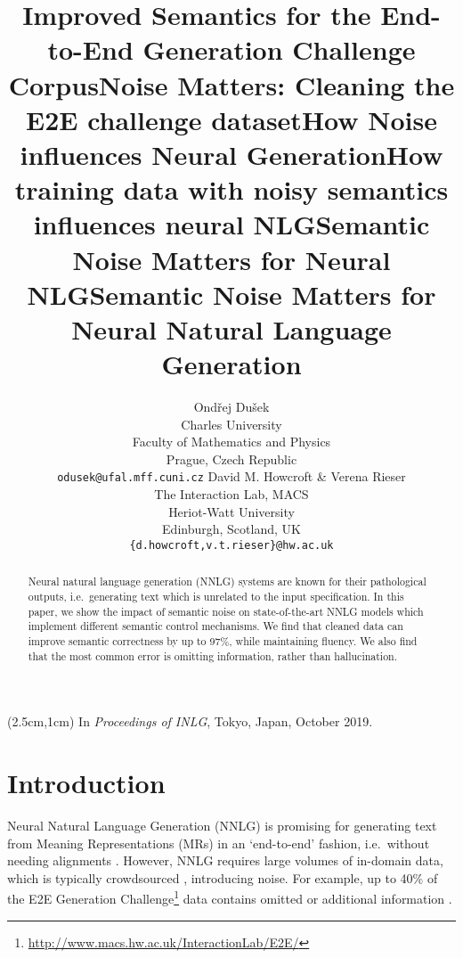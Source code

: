\documentclass[11pt,a4paper]{article}
\title{Improved Semantics for the End-to-End Generation Challenge Corpus}
\title{Noise Matters: Cleaning the E2E challenge dataset}
\title{How \OD{Training Data} Noise influences Neural Generation}
\title{How training data with noisy semantics influences neural NLG}
\title{Semantic Noise Matters for Neural NLG}
\title{Semantic Noise Matters for Neural Natural Language Generation}
\author{Ondřej Dušek\\ Charles University\\ 
Faculty of Mathematics and Physics \\
Prague, Czech Republic\\
\hspace{-2em}\texttt{odusek@ufal.mff.cuni.cz}
\And 
David M. Howcroft {\rm \&} Verena Rieser\\
The Interaction Lab, MACS\\
Heriot-Watt University \\
Edinburgh, Scotland, UK\\
\texttt{\{d.howcroft,v.t.rieser\}@hw.ac.uk}}
\date{}
\begin{document}
\maketitle

\begin{textblock*}{\textwidth}(2.5cm,1cm)
In \emph{Proceedings of INLG}, Tokyo, Japan, October 2019.
\end{textblock*}

\begin{abstract}

\setcounter{footnote}{1}
\renewcommand{\thefootnote}{\fnsymbol{footnote}}
\setcounter{footnote}{0}

Neural natural language generation (NNLG) systems are known for their pathological outputs, i.e.\ generating text which is unrelated to the input specification. In this paper, we show the impact of semantic noise on state-of-the-art NNLG models which implement different semantic control mechanisms.
We find that cleaned data can improve semantic correctness by up to 97\%, while maintaining fluency. 
We also find that the most common error is omitting information, rather than hallucination.
 
\end{abstract}


\section{Introduction}
\label{sec:introduction}

Neural Natural Language Generation (NNLG) is promising for generating text from Meaning Representations (MRs) in an  `end-to-end' fashion, i.e.\ without needing alignments \cite{wen:emnlp2015, Wen:NAACL16, Dusek:ACL16, Mei:NAACL2016}. 
However, NNLG requires large volumes of in-domain data, which is typically crowdsourced \citep[e.g.][]{mairesse:acl2010,novikova:INLG2016,wen:emnlp2015,Wen:NAACL16,howcroft.etal2017:interspeech}, introducing noise. 
For example, up to 40\% of the E2E Generation Challenge\footnote{\url{http://www.macs.hw.ac.uk/InteractionLab/E2E/}} data contains omitted or additional information \cite{dusek_evaluating_2019}. 
\end{document}
